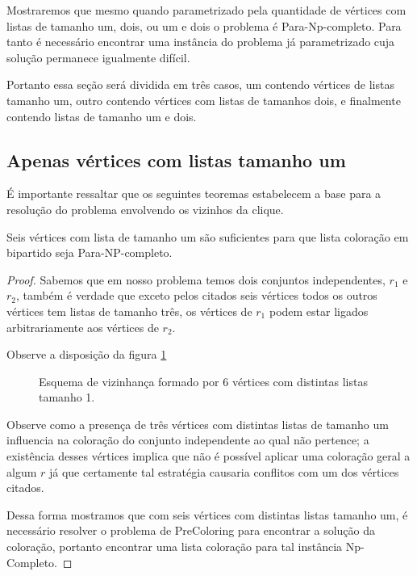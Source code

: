 Mostraremos que mesmo quando parametrizado pela quantidade de vértices com listas de tamanho um, dois, ou um e dois o problema é Para-Np-completo. Para tanto é necessário encontrar uma instância do problema já parametrizado cuja solução permanece igualmente difícil.

Portanto essa seção será dividida em três casos, um contendo vértices de listas tamanho um, outro contendo vértices com listas de tamanhos dois, e finalmente contendo listas de tamanho um e dois.
\subsection{Apenas vértices com listas tamanho um}
É importante ressaltar que os seguintes teoremas estabelecem a base para a resolução do problema envolvendo os vizinhos da clique. 
\begin{teorema}
 \label{teorema:6-v-np}
  Seis vértices com lista de tamanho um são suficientes para que lista coloração em bipartido seja Para-NP-completo. 
\end{teorema}
\begin{proof}
 Sabemos que em nosso problema temos dois conjuntos independentes, $r_1$ e $r_2$, também é verdade que exceto pelos citados seis vértices todos os outros vértices tem listas de tamanho três, os vértices de $r_1$ podem estar ligados arbitrariamente aos vértices de $r_2$. 
 
 Observe a disposição da figura \ref{fig:seis-vertices-lista-um}
 
\begin{figure}[H]
		\centering
		
		\caption{Esquema de vizinhança formado por 6 vértices com distintas listas tamanho 1. }
		\label{fig:seis-vertices-lista-um}
\end{figure}

Observe como a presença de três vértices com distintas listas de tamanho um influencia na coloração do conjunto independente ao qual não pertence; a existência desses vértices implica que não é possível aplicar uma coloração geral a algum $r$ já que certamente tal estratégia causaria conflitos com um dos vértices citados.

Dessa forma mostramos que com seis vértices com distintas listas tamanho um, é necessário resolver o problema de PreColoring para encontrar a solução da coloração, portanto encontrar uma lista coloração para tal instância Np-Completo. 

\end{proof}

